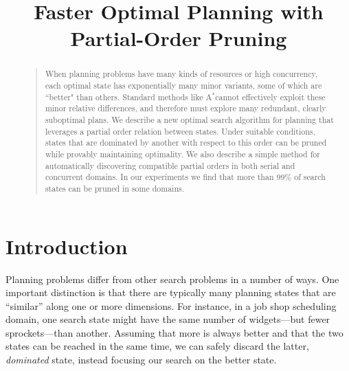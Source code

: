 \documentclass[letterpaper]{article}
\theoremstyle{plain} \newtheorem{theorem}{Theorem} \newtheorem{proposition}{Proposition} \newtheorem{lemma}{Lemma}
\theoremstyle{definition} \newtheorem{definition}{Definition} \newtheorem{conjecture}{Conjecture} \newtheorem*{example}{Example}
\theoremstyle{remark} \newtheorem*{remark}{Remark} \newtheorem*{note}{Note} \newtheorem{case}{Case}
\newcommand{\Astar}{A$^*$}
\begin{document}
%
\title{Faster Optimal Planning with Partial-Order Pruning}
\author{}

\maketitle
\begin{abstract}
\begin{quote}
  When planning problems have many kinds of resources or high
  concurrency, each optimal state has exponentially many minor
  variants, some of which are ``better" than others. Standard methods
  like \Astar cannot effectively exploit these minor relative differences,
  and therefore must explore many redundant, clearly suboptimal
  plans. We describe a new optimal search algorithm for planning
  that leverages a partial order relation between states. Under
  suitable conditions, states that are dominated by another with
  respect to this order can be pruned while provably maintaining
  optimality. We also describe a simple method for automatically
  discovering compatible partial orders in both serial and concurrent
  domains. In our experiments we find that more than 99\% of search
  states can be pruned in some domains.
\end{quote}
\end{abstract}

\section{Introduction}

Planning problems differ from other search problems in a number of
ways. One important distinction is that there are typically many
planning states that are ``similar'' along one or more dimensions.
For instance, in a job shop scheduling domain, one search state
might have the same number of widgets---but fewer sprockets---than
another. Assuming that more is always better and that the two states
can be reached in the same time, we can safely discard the latter,
\textit{dominated} state, instead focusing our search on the better
state.
\end{document}
